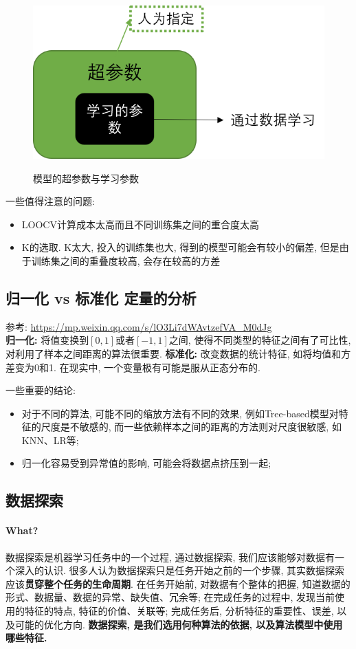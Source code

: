 \begin{figure}[h]
	\centering
	\includegraphics[width=.5\textwidth]{pics/model.png}
	\label{fig:model}
	\caption{模型的超参数与学习参数}
\end{figure}

一些值得注意的问题: 
\begin{itemize}
	\item LOOCV计算成本太高而且不同训练集之间的重合度太高
	\item K的选取. K太大, 投入的训练集也大, 得到的模型可能会有较小的偏差, 但是由于训练集之间的重叠度较高, 会存在较高的方差
\end{itemize}

\subsection{归一化 vs 标准化 定量的分析}
参考: \href{https://mp.weixin.qq.com/s/lO3Li7dWAvtzefVA_M0dJg}{https://mp.weixin.qq.com/s/lO3Li7dWAvtzefVA\_M0dJg}\\
\textbf{归一化: }将值变换到$[0, 1]$或者$[-1, 1]$之间, 使得不同类型的特征之间有了可比性, 对利用了样本之间距离的算法很重要. \textbf{标准化: }改变数据的统计特征, 如将均值和方差变为0和1. 在现实中, 一个变量极有可能是服从正态分布的. 


一些重要的结论: 
\begin{itemize}
	\item 对于不同的算法, 可能不同的缩放方法有不同的效果, 例如Tree-based模型对特征的尺度是不敏感的, 而一些依赖样本之间的距离的方法则对尺度很敏感, 如KNN、LR等; 
	\item 归一化容易受到异常值的影响, 可能会将数据点挤压到一起; 
\end{itemize}

\subsection{数据探索}
\paragraph{What?}数据探索是机器学习任务中的一个过程, 通过数据探索, 我们应该能够对数据有一个深入的认识. 很多人认为数据探索只是任务开始之前的一个步骤, 其实数据探索应该\textbf{贯穿整个任务的生命周期}. 在任务开始前, 对数据有个整体的把握, 知道数据的形式、数据量、数据的异常、缺失值、冗余等; 在完成任务的过程中, 发现当前使用的特征的特点, 特征的价值、关联等; 完成任务后, 分析特征的重要性、误差, 以及可能的优化方向. \textbf{数据探索, 是我们选用何种算法的依据, 以及算法模型中使用哪些特征. }

